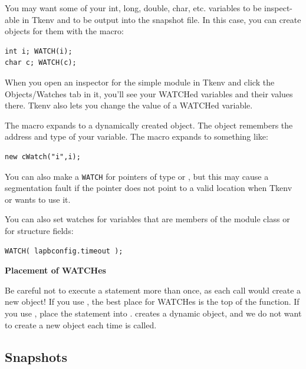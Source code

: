 You may want some of your int, long, double, char, etc. variables to
be inspect-able in Tkenv and to be output into the snapshot
file. In this case, you can create
 objects for them with the  macro:

\begin{verbatim}
int i; WATCH(i);
char c; WATCH(c);
\end{verbatim}

When you open an inspector for the simple module in Tkenv and click
the Objects/Watches tab in it, you'll see your WATCHed variables
and their values there. Tkenv also lets you change the value of a
WATCHed variable.

The  macro expands to a dynamically created 
object.  The object remembers the address and type of your variable.
The macro expands to something like:

\begin{verbatim}
new cWatch("i",i);
\end{verbatim}


You can also make a \texttt{WATCH} for pointers of type  or
, but this may cause a segmentation fault if
the pointer does not point to a valid location when Tkenv or
 wants to use it.

You can also set watches for variables that are members of the
module class or for structure fields:

\begin{verbatim}
WATCH( lapbconfig.timeout );
\end{verbatim}


\textbf{Placement of WATCHes}


Be careful not to execute a  statement more than once,
as each call would create a new  object! If you use
, the best place for WATCHes is the top of the
 function.  If you use ,
place the  statement into .
 creates a dynamic  object, and we do
not want to create a new object each time  is
called.



\subsection{Snapshots}

